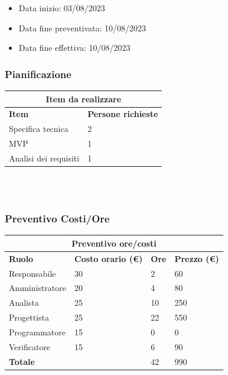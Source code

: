 \documentclass[9pt]{article}
\begin{document}
\begin{itemize}
	\item Data inizio: 03/08/2023
	\item Data fine preventivata: 10/08/2023
	\item Data fine effettiva: 10/08/2023
\end{itemize}
\subsubsection{Pianificazione}
\begin{center}
	\begin{tabularx}{\textwidth}{|X|X|}
		\hline
		\multicolumn{2}{|c|}{\textbf{Item da realizzare}}     \\
		\hline
		\hline
		\textbf{Item}            & \textbf{Persone richieste} \\
		\hline
		Specifica tecnica        	& 2                          \\
		\hline
		MVP        					& 1           \\
		\hline
		Analisi dei requisiti       & 1                          \\
		\hline
	\end{tabularx}\\[8pt]
	\mbox{}\\
\end{center}
\subsubsection{Preventivo Costi/Ore}
\begin{center}
	\begin{tabularx}{\textwidth}{|X|X|X|X|}
		\hline
		\multicolumn{4}{|c|}{\textbf{Preventivo ore/costi}}                                      \\
		\hline
		\hline
		\textbf{Ruolo}  & \textbf{Costo orario (\euro)} & \textbf{Ore} & \textbf{Prezzo (\euro)} \\
		\hline
		Responsabile    & 30                            & 2            & 60                      \\
		\hline
		Amministratore  & 20                            & 4            & 80                      \\
		\hline
		Analista        & 25                            & 10            & 250                       \\
		\hline
		Progettista     & 25                            & 22	            & 550                      \\
		\hline
		Programmatore   & 15                            & 0           & 0                     \\
		\hline
		Verificatore    & 15                            & 6           & 90                      \\
		\hline
		\textbf{Totale} &                               & 42           & 990                     \\
		\hline
	\end{tabularx}\\[8pt]
	\mbox{}\\
\end{center}
\end{document}
